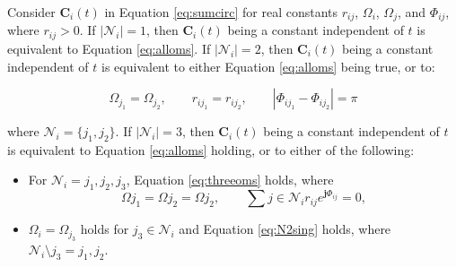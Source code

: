 \documentclass[graybox, envcountchap]{svmult}
\begin{document}
\begin{lemma}
\label{lem:sumc2}

Consider $\bm{C}_i (t)$ in Equation \ref{eq:sumcirc} for real constants
$r_{ij}$, $\Omega_i$, $\Omega_j$, and $\Phi_{ij}$, where $r_{ij}>0$. If
$|\mathcal{N}_i|=1$, then $\bm{C}_i (t)$ being a constant independent of $t$ is
equivalent to Equation \ref{eq:alloms}. If $|\mathcal{N}_i|=2$, then $\bm{C}_i
(t)$ being a constant independent of $t$ is equivalent to either Equation
\ref{eq:alloms} being true, or to:

\begin{equation}\label{eq:N2sing}
  \Omega_{j_1} = \Omega_{j_2}
  ,\qquad
  r_{i j_1} = r_{i j_2}
  ,\qquad
  |\Phi_{i j_1}-\Phi_{i j_2}| = \pi
\end{equation}

where $\mathcal{N}_i = \{j_1,j_2\}$.
If $|\mathcal{N}_i|=3$, then $\bm{C}_i(t)$ being a constant independent of $t$ is
equivalent to Equation \ref{eq:alloms} holding, or to either of the following:

\begin{itemize}
  \item For $\mathcal{N}_i ={j_1,j_2,j_3}$, Equation \ref{eq:threeoms} holds, where
  \begin{equation}\label{eq:threeoms}
    \Omega{j_1} = \Omega{j_2}= \Omega{j_2},
    \qquad
    \sum{j\in \mathcal{N}_i}
    r_{ij} e^{\bm{j} \Phi_{ij}}=0,
  \end{equation}
  \item $\Omega_{i} = \Omega_{j_3}$ holds for $j_3 \in \mathcal{N}_i$ and Equation \ref{eq:N2sing} holds, where $\mathcal{N}_i \setminus {j_3}={j_1,j_2}$.
\end{itemize}

\end{lemma}
\end{document}
